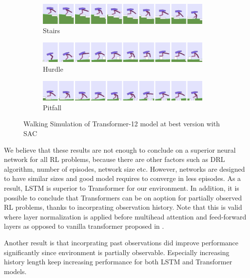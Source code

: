 \documentclass[a4paper, 12pt]{article} %
\begin{document}
\begin{figure}[!ht]
	\centering
	\begin{subfigure}{.95\textwidth}
		\centering
		\includegraphics[width=0.95\textwidth]{figures/bipedal/anim/trsf-12-stairs.png}
		\caption{Stairs}
		\label{fig:anim_trsf_stairs}
	\end{subfigure}
	\begin{subfigure}{.95\textwidth}
		\centering
		\includegraphics[width=0.95\textwidth]{figures/bipedal/anim/trsf-12-hurdle.png}
		\caption{Hurdle}
		\label{fig:anim_trsf_hurdle}
	\end{subfigure}
	\begin{subfigure}{.95\textwidth}
		\centering
		\includegraphics[width=0.95\textwidth]{figures/bipedal/anim/trsf-12-pitfall.png}
		\caption{Pitfall}
		\label{fig:anim_trsf_pitfall}
	\end{subfigure}
	\caption{Walking Simulation of Transformer-12 model at best version with SAC}
	\label{fig:trsf_simulation}
\end{figure}

We believe that these results are not enough to conclude on a superior neural network for all RL problems, because there are other factors such as DRL algorithm, number of episodes, network size etc. 
However, networks are designed to have similar sizes and good model requires to converge in less episodes. 
As a result, LSTM is superior to Transformer for our environment. 
In addition, it is possible to conclude that Transformers can be on aoption for partially observed RL problems, thanks to incorprating observation history. 
Note that this is valid where layer normalization is applied before multihead attention and feed-forward layers \cite{xiong_layer_2020} as opposed to vanilla transformer proposed in \cite{vaswani_attention_2017}. 

Another result is that incorprating past observations did improve performance significantly since environment is partially observable.
Especially increasing history length keep increasing performance for both LSTM and Transformer models. 
\end{document}
